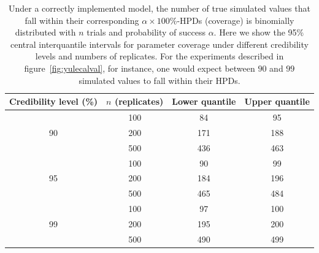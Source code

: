 \documentclass[oneside]{article}
\begin{document}
\begin{table}
\begin{center}
\begin{tabular}{cccc}
\hline
Credibility level (\%) & $n$ (replicates) & Lower quantile & Upper quantile \\ \hline
  \rowcolor{gray!10}   & 100            & 84    & 95    \\
  \rowcolor{gray!10}90 & 200            & 171   & 188   \\
  \rowcolor{gray!10}   & 500            & 436   & 463   \\
                       & 100            & 90    & 99    \\
                  95   & 200            & 184   & 196   \\
                       & 500            & 465   & 484   \\
  \rowcolor{gray!10}   & 100            & 97    & 100   \\
  \rowcolor{gray!10}99 & 200            & 195   & 200   \\
  \rowcolor{gray!10}   & 500            & 490   & 499   \\ \hline%
\end{tabular}
\end{center}
\caption{Under a correctly implemented model, the number of true simulated values that fall within their corresponding $\alpha\times 100$\%-HPDs (coverage) is binomially distributed with $n$ trials and probability of success $\alpha$.
  Here we show the 95\% central interquantile intervals for parameter coverage under different credibility levels and numbers of replicates.
  For the experiments described in figure~\ref{fig:yulecalval}, for instance, one would expect between $90$ and $99$ simulated values to fall within their HPDs.
  }
\label{tab:coverage2}
\end{table}
\end{document}
